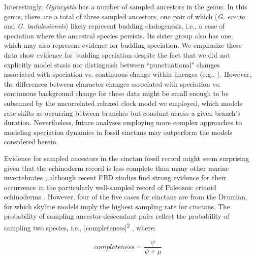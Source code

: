 \documentclass{article}
\begin{document}
Interestingly, \textit{Gyrocystis} has a number of sampled ancestors in the genus. In this genus, there are a total of three sampled ancestors, one pair of which (\textit{G. erecta} and \textit{G. badulesiensis}) likely represent budding cladogenesis, i.e., a case of speciation where the ancestral species persists. Its sister group also has one, which may also represent evidence for budding speciation. We emphasize these data show evidence for budding speciation despite the fact that we did not explicitly model stasis nor distinguish between ``punctuational" changes associated with speciation vs. continuous change within lineages (e.g., \citealp{EldredgeGould1972, WagnerMarcot2010}). However, the differences between character changes associated with speciation vs. continuous background change for these data might be small enough to be subsumed by the uncorrelated relaxed clock model we employed, which models rate shifts as occurring between branches but constant across a given branch's duration. Nevertheless, future analyses employing more complex approaches to modeling speciation dynamics in fossil cinctans may outperform the models considered herein.

Evidence for sampled ancestors in the cinctan fossil record might seem surprising given that the echinoderm record is less complete than many other marine invertebrates \citep{FooteSepkoski1999}, although recent FBD studies find strong evidence for their occurrence in the particularly well-sampled record of Paleozoic crinoid echinoderms \citep{Wright2017jp, WrightToom2017}.  However, four of the five cases for cinctans are from the Drumian, for which skyline models imply the highest sampling rate for cinctans. The probability of sampling ancestor-descendant pairs reflect the probability of sampling two species, i.e., [completeness]\textsuperscript{2} \citep{Foote1996c}, where:
\begin{center}
\[\textit{completeness} = \frac{\psi}{\psi+\mu}\]
\end{center}
\end{document}
